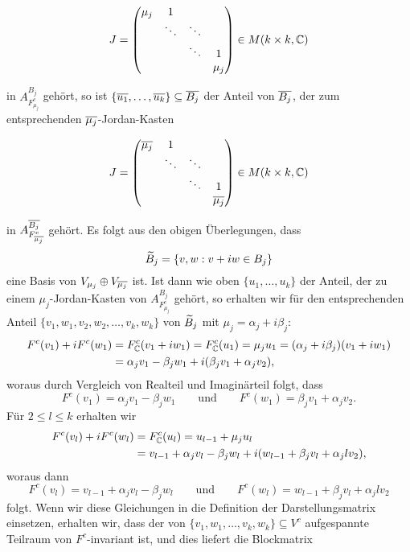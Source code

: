 \[
	J = \begin{pmatrix}
		\mu_j & 1      &        &  \\
		      & \ddots & \ddots &  \\
		      &        & \ddots & 1     \\
		      &        &        & \mu_j
	\end{pmatrix} \in M(k \times k,\mathbb{C})
\]

in $A_{F_{\mu_j}^c}^{B_j}$ gehört, so ist $\{\overline{u_1},\dots,\overline{u_k}\} \subseteq \overline{B_j}$ der Anteil von $\overline{B_j}$, der zum entsprechenden $\overline{\mu_j}$-Jordan-Kasten

\[
	J = \begin{pmatrix}
		\overline{\mu_j} & 1      &        &  \\
		           & \ddots & \ddots &  \\
		           &        & \ddots & 1          \\
		           &        &        & \overline{\mu_j}
	\end{pmatrix} \in M(k \times k,\mathbb{C})
\]

in $A_{F_{\overline{\mu_j}}^c}^{\overline{B_j}}$ gehört.
Es folgt aus den obigen Überlegungen, dass 
\[
	\widetilde{B}_j = \{ v,w : v+iw \in B_j\}
\]
eine Basis von $V_{\mu_j} \oplus V_{\overline{\mu_j}}$ ist.
Ist dann wie oben $\{u_1,\dots,u_k\}$ der Anteil, der zu einem $\mu_j$-Jordan-Kasten von $A_{F_{\mu_j}^c}^{B_j}$ gehört, so erhalten wir für den entsprechenden Anteil $\{v_1,w_1,v_2,w_2,\dots,v_k,w_k\}$ von $\widetilde{B}_j$ mit $\mu_j = \alpha_j + i \beta_j$:
\begin{align*}
	F^c(v_1) + iF^c(w_1) &= F_{\mathbb{C}}^c(v_1+iw_1) = F_{\mathbb{C}}^c(u_1) = \mu_j u_1 = (\alpha_j + i\beta_j)(v_1+iw_1) \\
	&= \alpha_jv_1 - \beta_j w_1 + i(\beta_j v_1 + \alpha_j v_2),
\end{align*}
woraus durch Vergleich von Realteil und Imaginärteil folgt, dass
\[
	F^c(v_1) = \alpha_j v_1 - \beta_j w_1 \qquad \text{und} \qquad F^c(w_1) = \beta_j v_1 + \alpha_j v_2.
\]
Für $2 \leq l \leq k$ erhalten wir
\begin{align*}
	F^c(v_l) + iF^c(w_l) &= F_{\mathbb{C}}^c(u_l) = u_{l-1} + \mu_j u_l \\
	&= v_{l-1} + \alpha_j v_l - \beta_j w_l + i(w_{l-1} + \beta_j v_l + \alpha_j l v_2),
\end{align*}
woraus dann
\[
	F^c(v_l) = v_{l-1} + \alpha_jv_l - \beta_jw_l \qquad \text{und} \qquad F^c(w_l) = w_{l-1} + \beta_j v_l + \alpha_j lv_2
\]
folgt.
Wenn wir diese Gleichungen in die Definition der Darstellungsmatrix einsetzen, erhalten wir, dass der von $\{v_1,w_1,\dots,v_k,w_k\} \subseteq V^c$ aufgespannte Teilraum von $F^c$-invariant ist, und dies liefert die Blockmatrix

